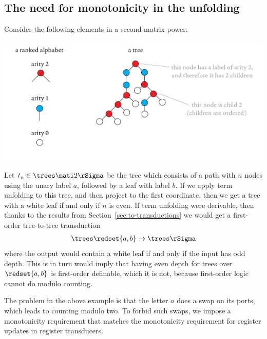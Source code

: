 \subsection{The need for monotonicity in the unfolding}
\begin{example}\label{eq:twist}
    Consider the following elements in a second matrix power:
\begin{center}
\includegraphics[scale=.3, page=84]{pics.pdf}
\end{center}
Let $t_n \in \trees \mati 2 \rSigma$ be the tree which consists of a path with $n$ nodes using the unary label $a$, followed by a leaf with label $b$. If we apply term unfolding to this tree, and then project to the first coordinate, then we get a tree with a white leaf if and only if  $n$ is even.  If term unfolding were derivable, then thanks to the results from Section~\ref{sec:to-transductions}  we would get a first-order tree-to-tree transduction 
\begin{align*}
\trees \redset{a,b} \to \trees \rSigma
\end{align*}
where the output would contain a white leaf if and only if the input has odd depth. This is in turn would imply that having even depth for trees over $\redset{a,b}$ is first-order definable, which it is not, because first-order logic cannot do modulo counting.
\end{example}
The problem in the above example is that the letter $a$ does a swap on its ports, which leads to counting modulo two. To forbid such swaps, we impose a monotonicity requirement that matches the monotonicity requirement for register updates in register transducers.
